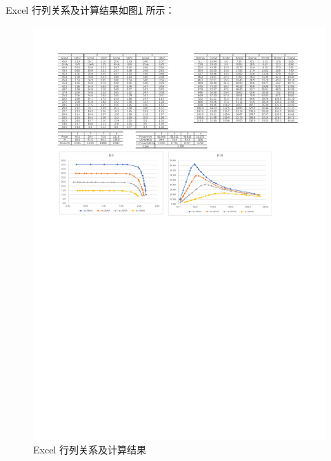 \documentclass[12pt]{article}
\begin{document}
Excel 行列关系及计算结果如图\ref{fig:final_table} 所示：
\begin{figure}[H] %
    \centering
    \includegraphics[width=\textwidth]{./figures/佐证材料.pdf} 
    \caption{Excel 行列关系及计算结果}
    \label{fig:final_table}
\end{figure}
\end{document}
